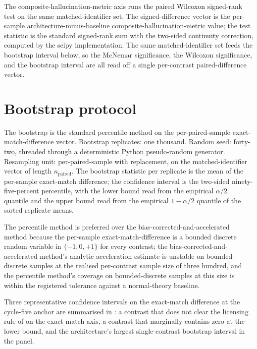The composite-hallucination-metric axis runs the paired Wilcoxon signed-rank test on the same matched-identifier set. The signed-difference vector is the per-sample architecture-minus-baseline composite-hallucination-metric value; the test statistic is the standard signed-rank sum with the two-sided continuity correction, computed by the scipy implementation. The same matched-identifier set feeds the bootstrap interval below, so the McNemar significance, the Wilcoxon significance, and the bootstrap interval are all read off a single per-contrast paired-difference vector.

\section{Bootstrap protocol}
\label{app:sig-bootstrap}

The bootstrap is the standard percentile method on the per-paired-sample exact-match-difference vector. Bootstrap replicates: one thousand. Random seed: forty-two, threaded through a deterministic Python pseudo-random generator. Resampling unit: per-paired-sample with replacement, on the matched-identifier vector of length $n_{\text{paired}}$. The bootstrap statistic per replicate is the mean of the per-sample exact-match difference; the confidence interval is the two-sided ninety-five-percent percentile, with the lower bound read from the empirical $\alpha/2$ quantile and the upper bound read from the empirical $1 - \alpha/2$ quantile of the sorted replicate means.

The percentile method is preferred over the bias-corrected-and-accelerated method because the per-sample exact-match-difference is a bounded discrete random variable in $\{-1, 0, +1\}$ for every contrast; the bias-corrected-and-accelerated method's analytic acceleration estimate is unstable on bounded-discrete samples at the realised per-contrast sample size of three hundred, and the percentile method's coverage on bounded-discrete samples at this size is within the registered tolerance against a normal-theory baseline.

Three representative confidence intervals on the exact-match difference at the cycle-five anchor are summarised in : a contrast that does not clear the licensing rule of  on the exact-match axis, a contrast that marginally contains zero at the lower bound, and the architecture's largest single-contrast bootstrap interval in the panel.

